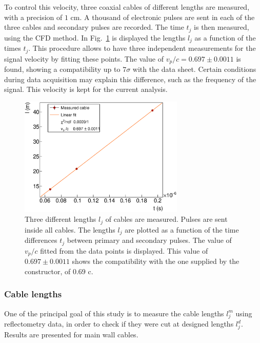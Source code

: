 To control this velocity, three coaxial cables of different lengths are measured, with a precision of $1$ cm.
A thousand of electronic pulses are sent in each of the three cables and secondary pulses are recorded.
The time $t_{j}$ is then measured, using the CFD method.
In Fig.~\ref{fig:celerity} is displayed the lengths $l_{j}$ as a function of the times $t_{j}$.
This procedure allows to have three independent measurements for the signal velocity by fitting these points.
The value of $v_{p}/c = 0.697\pm 0.0011$ is found, showing a compatibility up to $7\sigma$ with the data sheet.
Certain conditions during data acquisition may explain this difference, such as the frequency of the signal.
This velocity is kept for the current analysis.
\begin{figure}[h!]
  \centering
  \includegraphics[width=0.7\textwidth]{commissioning/fig_commissioning/celerity.eps}
  \caption{Three different lengths $l_{j}$ of cables are measured.
    Pulses are sent inside all cables.
    The lengths $l_{j}$ are plotted as a function of the time differences $t_{j}$ between primary and secondary pulses.
    The value of $v_{p}/c$ fitted from the data points is displayed.
    This value of $0.697\pm 0.0011$ shows the compatibility with the one supplied by the constructor, of $0.69$ c.
    \label{fig:celerity}}
\end{figure}

\subsubsection*{Cable lengths}

One of the principal goal of this study is to measure the cable lengths $l^{m}_{j}$ using reflectometry data, in order to check if they were cut at designed lengths $l^{d}_{j}$.
Results are presented for main wall cables.

